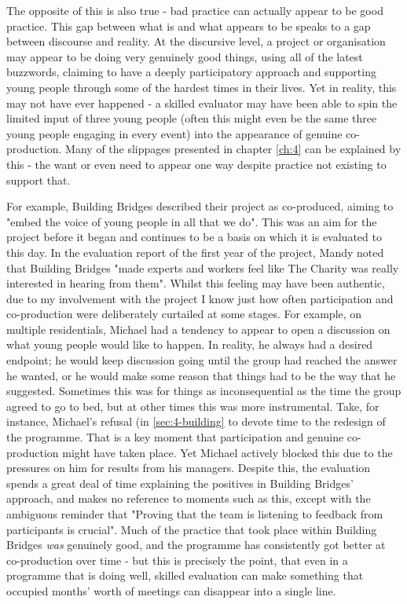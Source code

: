 The opposite of this is also true - bad practice can actually appear to be good practice. This gap between what is and what appears to be speaks to a gap between discourse and reality. At the discursive level, a project or organisation may appear to be doing very genuinely good things, using all of the latest buzzwords, claiming to have a deeply participatory approach and supporting young people through some of the hardest times in their lives. Yet in reality, this may not have ever happened - a skilled evaluator may have been able to spin the limited input of three young people (often this might even be the same three young people engaging in every event) into the appearance of genuine co-production. Many of the slippages presented in chapter \ref{ch:4} can be explained by this - the want or even need to appear one way despite  practice not existing to support that.

For example, Building Bridges described their project as co-produced, aiming to "embed the voice of young people in all that we do". This was an aim for the project before it began and continues to be a basis on which it is evaluated to this day. In the evaluation report of the first year of the project, Mandy noted that Building Bridges "made experts and workers feel like The Charity was really interested in hearing from them". Whilst this feeling may have been authentic, due to my involvement with the project I know just how often participation and co-production were deliberately curtailed at some stages. For example, on multiple residentials, Michael had a tendency to appear to open a discussion on what young people would like to happen. In reality, he always had a desired endpoint; he would keep discussion going until the group had reached the answer he wanted, or  he would make some reason that things had to be the way that he suggested. Sometimes this was for things as inconsequential as the time the group agreed to go to bed, but at other times this was more instrumental. Take, for instance, Michael's refusal (in \ref{sec:4-building} to devote time to the redesign of the programme. That is a key moment that participation and genuine co-production might have taken place. Yet Michael actively blocked this due to the pressures on him for results from his managers. Despite this, the evaluation spends a great deal of time explaining the positives in Building Bridges' approach, and makes no reference to moments such as this, except with the ambiguous reminder that "Proving that the team is listening to feedback from participants is crucial". Much of the practice that took place within Building Bridges \emph{was} genuinely good, and the programme has consistently got better at co-production over time - but this is precisely the point, that even in a programme that is doing well, skilled evaluation can make something that occupied months' worth of meetings can disappear into a single line.

